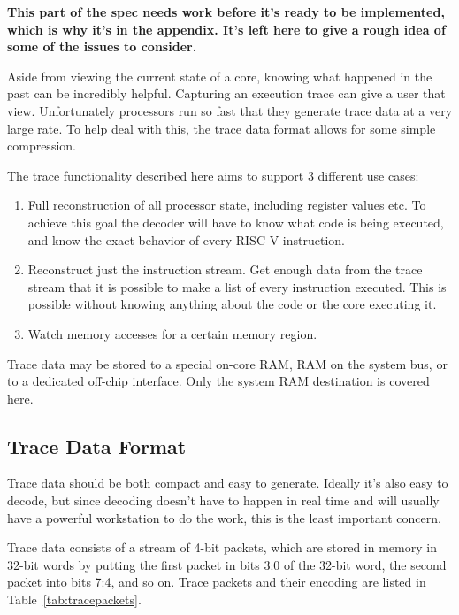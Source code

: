 \documentclass{article}
\begin{document}
{\bf This part of the spec needs work before it's ready to be implemented,
which is why it's in the appendix. It's left here to give a rough idea of some
of the issues to consider.}

Aside from viewing the current state of a core, knowing what happened in the
past can be incredibly helpful. Capturing an execution trace can give a user
that view.  Unfortunately processors run so fast that they generate trace data
at a very large rate. To help deal with this, the trace data format allows for
some simple compression.

The trace functionality described here aims to support 3 different use cases:
\begin{enumerate}
    \item Full reconstruction of all processor state, including register values
        etc. To achieve this goal the decoder will have to know what code is
        being executed, and know the exact behavior of every RISC-V
        instruction.
    \item Reconstruct just the instruction stream. Get enough data from the
        trace stream that it is possible to make a list of every instruction
        executed.  This is possible without knowing anything about the code or
        the core executing it.
    \item Watch memory accesses for a certain memory region.
\end{enumerate}

Trace data may be stored to a special on-core RAM, RAM on the system bus, or to
a dedicated off-chip interface. Only the system RAM destination is covered
here.

\subsection{Trace Data Format}

Trace data should be both compact and easy to generate. Ideally it's also easy
to decode, but since decoding doesn't have to happen in real time and will
usually have a powerful workstation to do the work, this is the least important
concern.

Trace data consists of a stream of 4-bit packets, which are stored in memory in
32-bit words by putting the first packet in bits 3:0 of the 32-bit word, the
second packet into bits 7:4, and so on. Trace packets and their encoding are
listed in Table~\ref{tab:tracepackets}.
\end{document}
